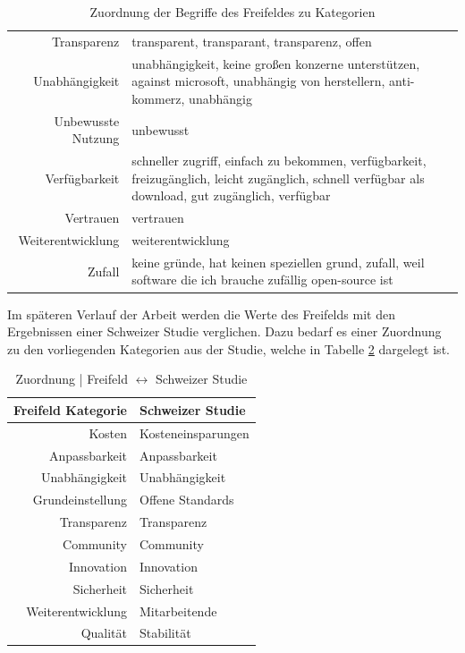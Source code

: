 \documentclass[a4paper]{article}
\begin{document}
\begin{table}[!htbp]
\begin{tabularx}{\textwidth}{rX}
                    Transparenz & \tiny transparent, transparant, transparenz, offen\\
                    Unabhängigkeit & \tiny unabhängigkeit, keine großen konzerne unterstützen, against microsoft, unabhängig von herstellern, anti-kommerz, unabhängig\\
                    Unbewusste Nutzung & \tiny unbewusst\\
                    Verfügbarkeit & \tiny schneller zugriff, einfach zu bekommen, verfügbarkeit, freizugänglich, leicht zugänglich, schnell verfügbar als download, gut zugänglich, verfügbar\\
                    Vertrauen & \tiny vertrauen\\
                    Weiterentwicklung & \tiny weiterentwicklung\\
                    Zufall & \tiny keine gründe, hat keinen speziellen grund, zufall, weil software die ich brauche zufällig open-source ist\\
                \end{tabularx}
                \caption{Zuordnung der Begriffe des Freifeldes zu Kategorien}
                \label{table:categories}
            \end{table}
            
            Im späteren Verlauf der Arbeit werden die Werte des Freifelds mit den Ergebnissen einer Schweizer Studie verglichen. Dazu bedarf es einer Zuordnung zu den vorliegenden Kategorien aus der Studie, welche in Tabelle \ref{table:privateToCommercialCategories} dargelegt ist.\\
            
            \begin{table}
                \centering
                \bgroup
                \def\arraystretch{1.5}
                \begin{tabular}{ r | l }
                    Freifeld Kategorie & Schweizer Studie\\ \hline
                    Kosten & Kosteneinsparungen\\
                    Anpassbarkeit & Anpassbarkeit\\
                    Unabhängigkeit & Unabhängigkeit\\
                    Grundeinstellung & Offene Standards\\
                    Transparenz & Transparenz\\
                    Community & Community\\
                    Innovation & Innovation\\
                    Sicherheit & Sicherheit\\
                    Weiterentwicklung & Mitarbeitende\\
                    Qualität & Stabilität
                \end{tabular}
                \egroup
                \caption{Zuordnung | Freifeld $\leftrightarrow$ Schweizer Studie}
                \label{table:privateToCommercialCategories}
            \end{table}
            
\end{document}
